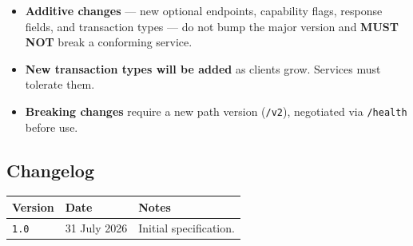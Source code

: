 \documentclass[11pt,a4paper]{article}
\newcommand{\code}[1]{\texttt{\small #1}}
\begin{document}
\begin{itemize}
\item \textbf{Additive changes} --- new optional endpoints, capability flags, response fields, and
      transaction types --- do not bump the major version and \textbf{MUST NOT} break a conforming
      service.
\item \textbf{New transaction types will be added} as clients grow. Services must tolerate them.
\item \textbf{Breaking changes} require a new path version (\code{/v2}), negotiated via
      \code{/health} before use.
\end{itemize}

\subsection*{Changelog}

\begin{tabularx}{\linewidth}{L{2.4cm} L{3.2cm} X}
\toprule
\textbf{Version} & \textbf{Date} & \textbf{Notes}\\
\midrule
\code{1.0} & 31 July 2026 & Initial specification.\\
\bottomrule
\end{tabularx}
\end{document}
